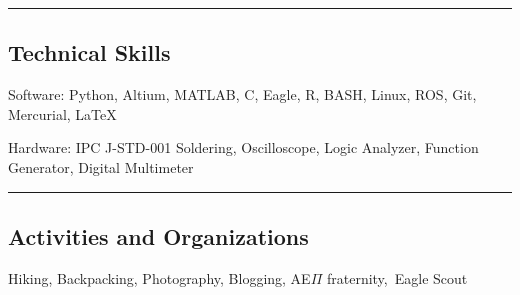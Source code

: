 \documentclass[10pt,letterpaper]{article}
\newenvironment{indentsection}[1]%
{\begin{list}{}%
	{\setlength{\leftmargin}{#1}}%
	\item[]%
}
{\end{list}}
\begin{document}
\hrule
\vspace{-0.4em}
\subsection*{Technical Skills}

\begin{description*}
	\item[Software:]
	 Python, Altium, MATLAB, C, Eagle, R, BASH, Linux, ROS, Git, Mercurial, \LaTeX
	\item[Hardware:]
	IPC J-STD-001 Soldering, Oscilloscope, Logic Analyzer, Function Generator, Digital Multimeter
\end{description*}

\hrule
\vspace{-0.4em}
\subsection*{Activities and Organizations}
\indent Hiking, Backpacking, Photography, Blogging, AE$\Pi$ fraternity,\, Eagle Scout
\end{document}
